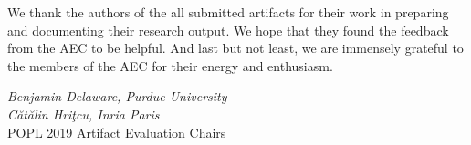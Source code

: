 We thank the authors of the all submitted artifacts for their work in
preparing and documenting their research output. We hope that they
found the feedback from the AEC to be helpful. And last but not least,
we are immensely grateful to the members of the AEC for their energy
and enthusiasm.

\begin{flushright}
\textit{Benjamin Delaware, Purdue University} \\
\textit{C\u{a}t\u{a}lin Hri\c{t}cu, Inria Paris} \\
POPL 2019 Artifact Evaluation Chairs
\end{flushright}

\newpage
